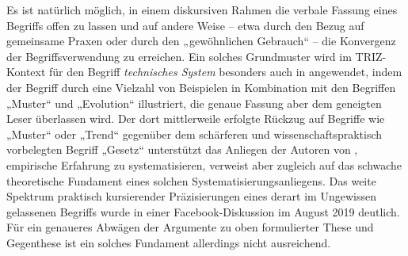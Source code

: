 \documentclass[11pt,a4paper]{article}
\begin{document}
Es ist natürlich möglich, in einem diskursiven Rahmen die verbale Fassung
eines Begriffs offen zu lassen und auf andere Weise -- etwa durch den Bezug
auf gemeinsame Praxen oder durch den „gewöhnlichen Gebrauch“ -- die Konvergenz
der Begriffsverwendung zu erreichen.  Ein solches Grundmuster wird im
TRIZ-Kontext für den Begriff \emph{technisches System} besonders auch in
\cite{TESE2018} angewendet, indem der Begriff durch eine Vielzahl von
Beispielen in Kombination mit den Begriffen „Muster“ und „Evolution“
illustriert, die genaue Fassung aber dem geneigten Leser überlassen wird.  Der
dort mittlerweile erfolgte Rückzug auf Begriffe wie „Muster“ oder „Trend“
gegenüber dem schärferen und wissenschaftspraktisch vorbelegten Begriff
„Gesetz“ unterstützt das Anliegen der Autoren von \cite{TESE2018}, empirische
Erfahrung zu systematisieren, verweist aber zugleich auf das schwache
theoretische Fundament eines solchen Systematisierungsanliegens.  Das weite
Spektrum praktisch kursierender Präzisierungen eines derart im Ungewissen
gelassenen Begriffs wurde in einer Facebook-Diskussion \cite{Graebe2019} im
August 2019 deutlich. Für ein genaueres Abwägen der Argumente zu oben
formulierter These und Gegenthese ist ein solches Fundament allerdings nicht
ausreichend.
\end{document}
